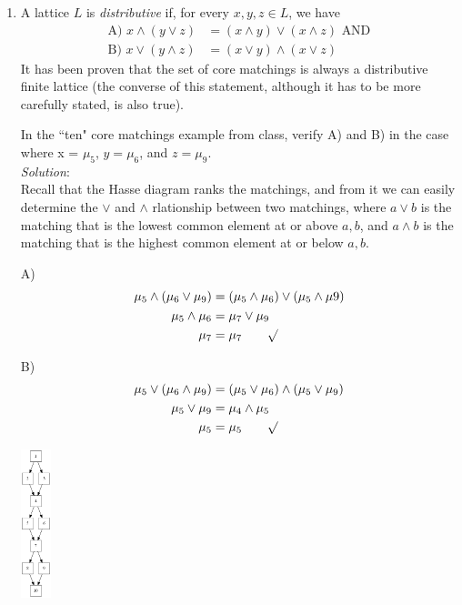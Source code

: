 \documentclass{article}
\begin{document}
\begin{enumerate}
%
\item A lattice $L$ is \emph{distributive} if, for every $x, y, z \in L$, we have
\begin{align*}
\text{A) } x \wedge (y \vee z)    &=  (x \wedge y) \vee   (x \wedge z) \text{ AND} \\
\text{B) } x \vee   (y \wedge z)  &=  (x \vee y)   \wedge (x \vee z)
\end{align*}
It has been proven that the set of core matchings is always a distributive finite lattice (the converse of this statement, although it has to be more carefully stated, is also true).

In the ``ten" core matchings example from class, verify A) and B) in the case where x = $\mu_{5}$, $y = \mu_{6}$, and $z = \mu_{9}$. \\

\textit{Solution}: \\

Recall that the Hasse diagram ranks the matchings, and from it we can easily determine the $\vee$ and $\wedge$ rlationship between two matchings, where $a \vee b$ is the matching that is the lowest common element at or above $a, b$, and $a \wedge b$ is the matching that is the highest common element at or below $a, b$.

A)\begin{align*}
\mu_{5} \wedge (\mu_{6} \vee \mu_{9})    &=  (\mu_{5} \wedge \mu_{6}) \vee   (\mu_{5} \wedge \mu{9}) \\
\mu_{5} \wedge \mu_{6}                   &=  \mu_{7}                  \vee   \mu_{9} \\
\mu_{7}                                  &=  \mu_{7}  \qquad \surd
\end{align*}

B)\begin{align*}
\mu_{5} \vee   (\mu_{6} \wedge \mu_{9})  &=  (\mu_{5} \vee \mu_{6})   \wedge (\mu_{5} \vee \mu_{9}) \\
\mu_{5} \vee   \mu_{9}                   &=  \mu_{4}                  \wedge \mu_{5} \\
\mu_{5}                                  &=  \mu_{5}  \qquad \surd
\end{align*}

\includegraphics[width=0.07\textwidth]{hw7-3}


\end{enumerate}
\end{document}
